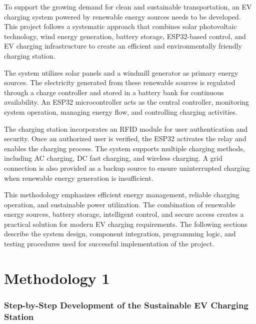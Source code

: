 \documentclass[12pt]{report}
\begin{document}
\begin{Certificatepage}
\begin{center}
\begin{justify}
To support the growing demand for clean and sustainable transportation, an EV charging system powered by renewable energy sources needs to be developed. This project follows a systematic approach that combines solar photovoltaic technology, wind energy generation, battery storage, ESP32-based control, and EV charging infrastructure to create an efficient and environmentally friendly charging station.
\vspace{10pt}
\par
The system utilizes solar panels and a windmill generator as primary energy sources. The electricity generated from these renewable sources is regulated through a charge controller and stored in a battery bank for continuous availability. An ESP32 microcontroller acts as the central controller, monitoring system operation, managing energy flow, and controlling charging activities.

\vspace{10pt}
The charging station incorporates an RFID module for user authentication and security. Once an authorized user is verified, the ESP32 activates the relay and enables the charging process. The system supports multiple charging methods, including AC charging, DC fast charging, and wireless charging. A grid connection is also provided as a backup source to ensure uninterrupted charging when renewable energy generation is insufficient.

\vspace{10pt}
This methodology emphasizes efficient energy management, reliable charging operation, and sustainable power utilization. The combination of renewable energy sources, battery storage, intelligent control, and secure access creates a practical solution for modern EV charging requirements. The following sections describe the system design, component integration, programming logic, and testing procedures used for successful implementation of the project.

 

\newpage
\section{Methodology 1}
\label{m1}

\subsubsection{Step-by-Step Development of the Sustainable EV Charging Station}
\vspace{10pt}


\end{justify}
\end{center}
\end{Certificatepage}
\end{document}
